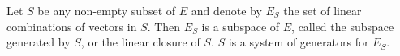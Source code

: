 Let $S$ be any non-empty subset of $E$ and denote by $E_S$ the set of linear combinations of vectors in $S$. Then $E_S$ is a subspace of $E$, called the subspace generated by $S$, or the linear closure of $S$. $S$ is a system of generators for $E_S$.
